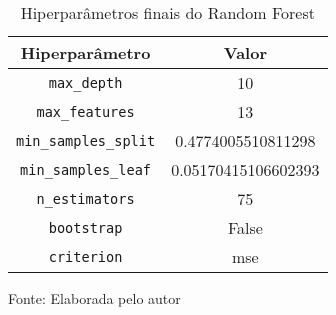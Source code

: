
\begin{table}[h]
\centering
\caption{Hiperparâmetros finais do Random Forest}
\label{tab:cap3_parametros_random_forest}
\begin{tabular}{cc}
Hiperparâmetro & Valor \\
\hline
\verb|max_depth| & 10 \\
\verb|max_features| & 13 \\
\verb|min_samples_split| & 0.4774005510811298 \\
\verb|min_samples_leaf| & 0.05170415106602393 \\
\verb|n_estimators| & 75 \\
\verb|bootstrap| & False \\
\verb|criterion| & mse \\
\hline
\end{tabular}

Fonte: Elaborada pelo autor
\end{table}











